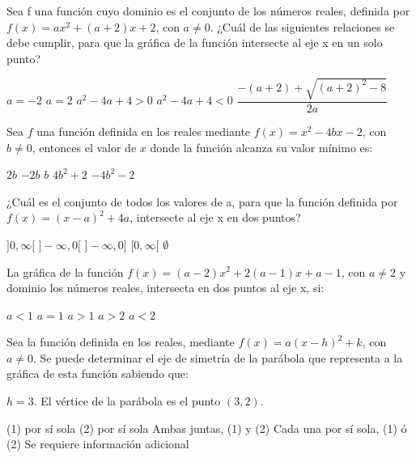 \documentclass[sin nombre]{srs}
\begin{document}
\begin{preguntas}[after-item-skip=2cm]
\pregunta Sea f una función cuyo dominio es el conjunto de los números reales, definida por $f\left(x\right) = ax^{2} + \left(a + 2\right)x + 2$, con $a \neq 0$. ¿Cuál de las siguientes relaciones se debe cumplir, para que la gráfica de la función intersecte al eje x en un solo punto?
\begin{vertical}
\alternativa $a = -2$
\alternativa $a = 2$
\alternativa $a^{2}-4a + 4 > 0$
\alternativa $a^{2} - 4a + 4 < 0$
\alternativa $\dfrac{-\left(a + 2\right) + \sqrt{\left(a + 2\right)^{2} - 8}}{2a}$
\end{vertical}

\pregunta Sea $f$ una función definida en los reales mediante $f\left(x\right) = x^{2} - 4bx - 2$, con $b \neq 0$, entonces el valor de $x$ donde la función alcanza su valor mínimo es:
\begin{vertical}
\alternativa $2b$
\alternativa $-2b$
\alternativa $b$
\alternativa $4b^{2} + 2$
\alternativa $-4b^{2} - 2$
\end{vertical}

\pregunta ¿Cuál es el conjunto de todos los valores de a, para que la función definida por $f\left(x\right) = \left(x - a\right)^{2} + 4a$, intersecte al eje x en dos puntos?
\begin{vertical}
\alternativa $]0, \infty[$
\alternativa $]-\infty, 0[$
\alternativa $]-\infty, 0]$
\alternativa $[0, \infty[$
\alternativa $\emptyset$
\end{vertical}

\pregunta La gráfica de la función $f\left(x\right) = \left(a - 2\right)x^{2} + 2\left(a - 1\right)x + a - 1$, con $a \neq 2$ y dominio los números reales, intersecta en dos puntos al eje x, si:
\begin{vertical}
\alternativa $a < 1$
\alternativa $a = 1$
\alternativa $a > 1$
\alternativa $a > 2$
\alternativa $a < 2$
\end{vertical}

\pregunta Sea la función definida en los reales, mediante $f\left(x\right) = a\left(x - h\right)^{2} + k$, con $a \neq 0$. Se puede determinar el eje de simetría de la parábola que representa a la gráfica de esta función sabiendo que:
\begin{verticaln}
\alternativa $h = 3$.
\alternativa El vértice de la parábola es el punto $\left(3,2\right)$.
\end{verticaln}
\begin{vertical}
\alternativa (1) por sí sola
\alternativa (2) por sí sola
\alternativa Ambas juntas, (1) y (2)
\alternativa Cada una por sí sola, (1) ó (2)
\alternativa Se requiere información adicional
\end{vertical}


\end{preguntas}
\end{document}
